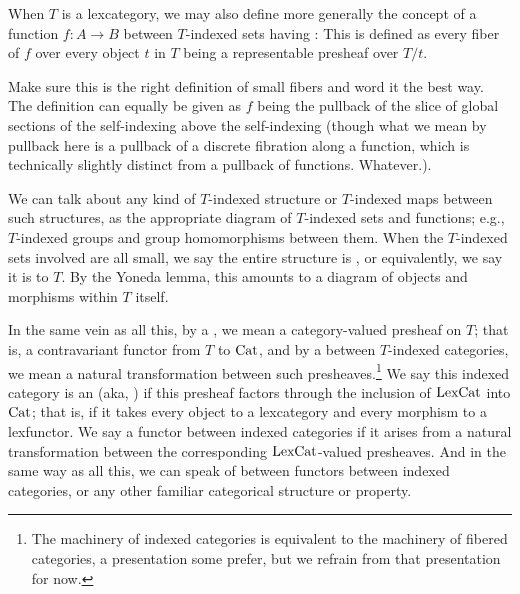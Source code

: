 
When $T$ is a lexcategory, we may also define more generally the concept of a function $f : A \to B$ between $T$-indexed sets having : This is defined as every fiber of $f$ over every object $t$ in $T$ being a representable presheaf over $T/t$.

\begin{TODOblock}
Make sure this is the right definition of small fibers and word it the best way. The definition can equally be given as $f$ being the pullback of the slice of global sections of the self-indexing above the self-indexing (though what we mean by pullback here is a pullback of a discrete fibration along a function, which is technically slightly distinct from a pullback of functions. Whatever.).
\end{TODOblock}

We can talk about any kind of $T$-indexed structure or $T$-indexed maps between such structures, as the appropriate diagram of $T$-indexed sets and functions; e.g., $T$-indexed groups and group homomorphisms between them. When the $T$-indexed sets involved are all small, we say the entire structure is , or equivalently, we say it is  to $T$. By the Yoneda lemma, this amounts to a diagram of objects and morphisms within $T$ itself.

In the same vein as all this, by a , we mean a category-valued presheaf on $T$; that is, a contravariant functor from $T$ to $\mathrm{Cat}$, and by a  between $T$-indexed categories, we mean a natural transformation between such presheaves.\footnote{The machinery of indexed categories is equivalent to the machinery of fibered categories, a presentation some prefer, but we refrain from that presentation for now.} We say this indexed category is an  (aka, ) if this presheaf factors through the inclusion of $\mathrm{LexCat}$ into $\mathrm{Cat}$; that is, if it takes every object to a lexcategory and every morphism to a lexfunctor. We say a functor between indexed categories  if it arises from a natural transformation between the corresponding $\mathrm{LexCat}$-valued presheaves. And in the same way as all this, we can speak of  between functors between indexed categories, or any other familiar categorical structure or property.

